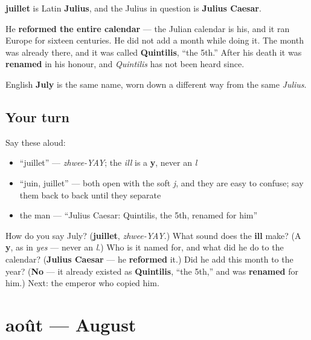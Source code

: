 \begin{cousinweb}
\textbf{juillet} is Latin \textbf{Julius}, and the Julius in question is \textbf{Julius Caesar}.

He \textbf{reformed the entire calendar} — the Julian calendar is his, and it ran Europe for sixteen centuries. He did not add a month while doing it. The month was already there, and it was called \textbf{Quintilis}, \textquotedblleft{}the 5th.\textquotedblright{} After his death it was \textbf{renamed} in his honour, and \emph{Quintilis} has not been heard since.

English \textbf{July} is the same name, worn down a different way from the same \emph{Julius}.
\end{cousinweb}

\subsection*{Your turn}
Say these aloud:

\begin{itemize}
\raggedright
  \item \textquotedblleft{}juillet\textquotedblright{} — \emph{zhwee-YAY}; the \emph{ill} is a \textbf{y}, never an \emph{l}
  \item \textquotedblleft{}juin, juillet\textquotedblright{} — both open with the soft \emph{j}, and they are easy to confuse; say them back to back until they separate
  \item the man — \textquotedblleft{}Julius Caesar: Quintilis, the 5th, renamed for him\textquotedblright{}
\end{itemize}

\begin{tcolorbox}[breakable,colback=teal!4,colframe=teal!35!black,title={Before you move on}]
How do you say July? (\textbf{juillet}, \emph{zhwee-YAY}.) What sound does the \textbf{ill} make? (A \textbf{y}, as in \emph{yes} — never an \emph{l}.) Who is it named for, and what did he do to the calendar? (\textbf{Julius Caesar} — he \textbf{reformed} it.) Did he add this month to the year? (\textbf{No} — it already existed as \textbf{Quintilis}, \textquotedblleft{}the 5th,\textquotedblright{} and was \textbf{renamed} for him.) Next: the emperor who copied him.
\end{tcolorbox}
\section[août]{août — August}

